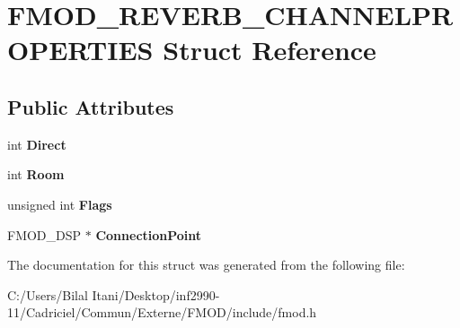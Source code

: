 \hypertarget{struct_f_m_o_d___r_e_v_e_r_b___c_h_a_n_n_e_l_p_r_o_p_e_r_t_i_e_s}{}\section{F\+M\+O\+D\+\_\+\+R\+E\+V\+E\+R\+B\+\_\+\+C\+H\+A\+N\+N\+E\+L\+P\+R\+O\+P\+E\+R\+T\+I\+ES Struct Reference}
\label{struct_f_m_o_d___r_e_v_e_r_b___c_h_a_n_n_e_l_p_r_o_p_e_r_t_i_e_s}
\subsection*{Public Attributes}
\begin{DoxyCompactItemize}
\item 
int {\bfseries Direct}\hypertarget{struct_f_m_o_d___r_e_v_e_r_b___c_h_a_n_n_e_l_p_r_o_p_e_r_t_i_e_s_a4b8d70f2215d3170ef4d2d06db7a41bf}{}\label{struct_f_m_o_d___r_e_v_e_r_b___c_h_a_n_n_e_l_p_r_o_p_e_r_t_i_e_s_a4b8d70f2215d3170ef4d2d06db7a41bf}

\item 
int {\bfseries Room}\hypertarget{struct_f_m_o_d___r_e_v_e_r_b___c_h_a_n_n_e_l_p_r_o_p_e_r_t_i_e_s_a4c5a73c7a00690a7e25d3b4ab50c6cc6}{}\label{struct_f_m_o_d___r_e_v_e_r_b___c_h_a_n_n_e_l_p_r_o_p_e_r_t_i_e_s_a4c5a73c7a00690a7e25d3b4ab50c6cc6}

\item 
unsigned int {\bfseries Flags}\hypertarget{struct_f_m_o_d___r_e_v_e_r_b___c_h_a_n_n_e_l_p_r_o_p_e_r_t_i_e_s_ac1b89e86a536121fc1c1d0602f7346d7}{}\label{struct_f_m_o_d___r_e_v_e_r_b___c_h_a_n_n_e_l_p_r_o_p_e_r_t_i_e_s_ac1b89e86a536121fc1c1d0602f7346d7}

\item 
F\+M\+O\+D\+\_\+\+D\+SP $\ast$ {\bfseries Connection\+Point}\hypertarget{struct_f_m_o_d___r_e_v_e_r_b___c_h_a_n_n_e_l_p_r_o_p_e_r_t_i_e_s_afa124f21c3035badddc2dabc008ec0c5}{}\label{struct_f_m_o_d___r_e_v_e_r_b___c_h_a_n_n_e_l_p_r_o_p_e_r_t_i_e_s_afa124f21c3035badddc2dabc008ec0c5}

\end{DoxyCompactItemize}


The documentation for this struct was generated from the following file\+:\begin{DoxyCompactItemize}
\item 
C\+:/\+Users/\+Bilal Itani/\+Desktop/inf2990-\/11/\+Cadriciel/\+Commun/\+Externe/\+F\+M\+O\+D/include/fmod.\+h\end{DoxyCompactItemize}
